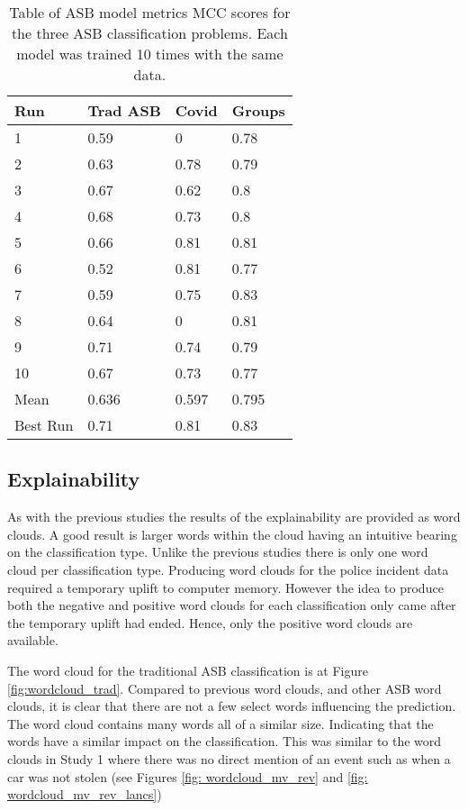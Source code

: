\begin{table}[h]
\centering
\begin{tabular}{@{}llll@{}}
\toprule
Run      & Trad ASB & Covid & Groups \\ \midrule
1        & 0.59     & 0     & 0.78   \\
2        & 0.63     & 0.78  & 0.79   \\
3        & 0.67     & 0.62  & 0.8    \\
4        & 0.68     & 0.73  & 0.8    \\
5        & 0.66     & 0.81  & 0.81   \\
6        & 0.52     & 0.81  & 0.77   \\
7        & 0.59     & 0.75  & 0.83   \\
8        & 0.64     & 0     & 0.81   \\
9        & 0.71     & 0.74  & 0.79   \\
10       & 0.67     & 0.73  & 0.77   \\
Mean     & 0.636    & 0.597 & 0.795  \\
Best Run & 0.71     & 0.81  & 0.83   \\ \bottomrule
\end{tabular}
    \caption[Table of ASB model metrics]{{Table of ASB model metrics} MCC scores for the three ASB classification problems. Each model was trained 10 times with the same data.}
    \label{tab: asb_metrics}
\end{table}

\subsection{Explainability} As with the previous studies the results of the explainability are provided as word clouds. A good result is larger words within the cloud having an intuitive bearing on the classification type. Unlike the previous studies there is only one word cloud per classification type. Producing word clouds for the police incident data required a temporary uplift to computer memory. However the idea to  produce both the negative and positive word clouds for each classification only came after the temporary uplift had ended. Hence, only the positive word clouds are available. 

The word cloud for the traditional ASB classification is at Figure \ref{fig:wordcloud_trad}. Compared to previous word clouds, and other ASB word clouds, it is clear that there are not a few select words influencing the prediction. The word cloud contains many words all of a similar size. Indicating that the words have a similar impact on the classification. This was similar to the word clouds in Study 1 where there was no direct mention of an event such as when a car was not stolen (see Figures \ref{fig: wordcloud_mv_rev} and \ref{fig: wordcloud_mv_rev_lancs})

